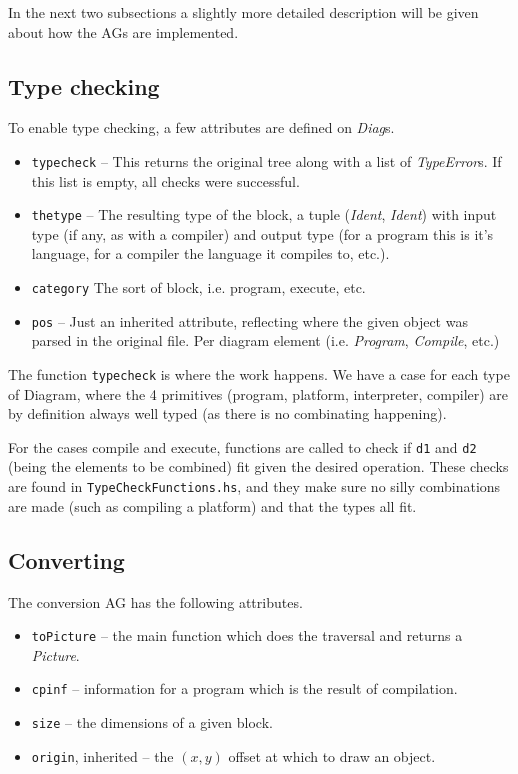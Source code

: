 \documentclass[a4paper]{article}
\begin{document}
In the next two subsections a slightly more detailed description will be given about how the AGs are implemented. 

\subsection{Type checking}

To enable type checking, a few attributes are defined on \emph{Diag}s. 

\begin{itemize}
    \item \texttt{typecheck} -- This returns the original tree along with a list of \emph{TypeError}s. If this list is empty, all checks were successful. 
    \item \texttt{thetype} -- The resulting type of the block, a tuple (\emph{Ident}, \emph{Ident}) with input type (if any, as with a compiler) and output type (for a program this is it's language, for a compiler the language it compiles to, etc.).
    \item \texttt{category} The sort of block, i.e. program, execute, etc. 
    \item \texttt{pos} -- Just an inherited attribute, reflecting where the given object was parsed in the original file. Per diagram element (i.e. \emph{Program}, \emph{Compile}, etc.)
\end{itemize}

The function \texttt{typecheck} is where the work happens. We have a case for each type of Diagram, where the 4 primitives (program, platform, interpreter, compiler) are by definition always well typed (as there is no combinating happening). 

For the cases compile and execute, functions are called to check if \texttt{d1} and \texttt{d2} (being the elements to be combined) fit given the desired operation. These checks are found in \texttt{TypeCheckFunctions.hs}, and they make sure no silly combinations are made (such as compiling a platform) and that the types all fit.  


\subsection{Converting}

The conversion AG has the following attributes.

\begin{itemize}
    \item \texttt{toPicture} -- the main function which does the traversal and returns a \emph{Picture}.
    \item \texttt{cpinf} -- information for a program which is the result of compilation.
    \item \texttt{size} -- the dimensions of a given block. 
    \item \texttt{origin}, inherited -- the $(x,y)$ offset at which to draw an object.
\end{itemize}
\end{document}
